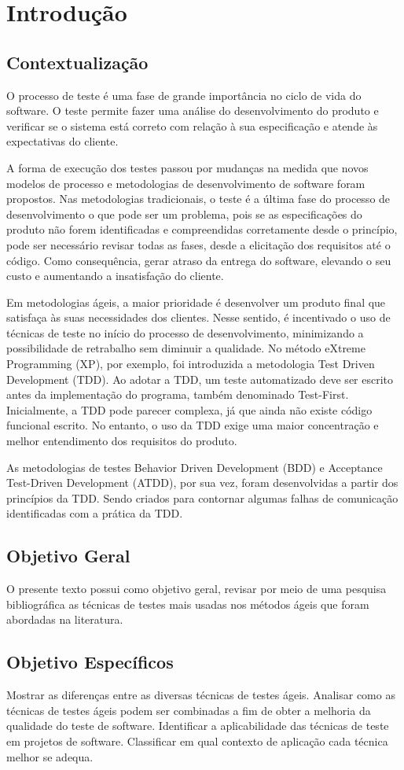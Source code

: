\chapter{Introdução}\label{CAP:introducao}
\section{Contextualização}
O processo de teste é uma fase de grande importância no ciclo de vida do software. O teste permite fazer uma análise do desenvolvimento do produto e verificar se o sistema está correto com relação à sua especificação e atende às expectativas do cliente. 

A forma de execução dos testes passou por mudanças na medida que novos modelos de processo e metodologias de desenvolvimento de software foram propostos. Nas metodologias tradicionais, o teste é a última fase do processo de desenvolvimento o que pode ser um problema, pois se as especificações do produto não forem identificadas e compreendidas corretamente desde o princípio, pode ser necessário revisar todas as fases, desde a elicitação dos requisitos até o código. Como consequência, gerar atraso da entrega do software, elevando o seu custo e aumentando a insatisfação do cliente. 

Em metodologias ágeis, a maior prioridade é desenvolver um produto final que satisfaça às suas necessidades dos clientes. Nesse sentido, é incentivado o uso de técnicas de teste no início do processo de desenvolvimento, minimizando a possibilidade de retrabalho sem diminuir a qualidade. 
No método eXtreme Programming (XP), por exemplo, foi introduzida a metodologia Test Driven Development (TDD). Ao adotar a TDD, um teste automatizado deve ser escrito antes da implementação do programa, também denominado Test-First. Inicialmente, a TDD pode parecer complexa, já que ainda não existe código funcional escrito. No entanto, o uso da TDD exige uma maior concentração e melhor entendimento dos requisitos do produto. 

As metodologias de testes Behavior Driven Development (BDD) e Acceptance Test-Driven Development (ATDD), por sua vez, foram desenvolvidas a partir dos princípios da TDD. Sendo criados para contornar algumas falhas de comunicação identificadas com a prática da TDD.  


\section{Objetivo Geral}

O presente texto possui como objetivo geral, revisar por meio de uma pesquisa bibliográfica as técnicas de testes mais usadas nos métodos ágeis que  foram abordadas na literatura.

\section{Objetivo Específicos}

Mostrar as diferenças entre as diversas técnicas de testes ágeis.
Analisar como as técnicas de testes ágeis podem ser combinadas a fim de obter a melhoria da qualidade do teste de software.
Identificar a aplicabilidade das técnicas de teste em projetos de software.
Classificar em qual contexto de aplicação cada técnica melhor se adequa.